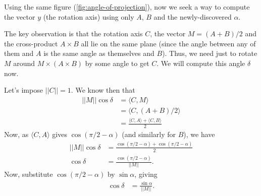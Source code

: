 \documentclass{article}
\begin{document}
Using the same figure (\ref{fig:angle-of-projection}),
now we seek a way to compute the vector $y$
(the rotation axis)
using only $A$, $B$ and the newly-discovered $\alpha$.

The key observation is that the rotation axis $C$,
the vector $M = (A + B)/2$ and the cross-product $A \times B$
all lie on the same plane
(since the angle between any of them and $A$ is the same angle as
themselves and $B$).
Thus, we need just to rotate $M$ around $M \times (A \times B)$
by some angle to get $C$.
We will compute this angle $\delta$ now.

Let's impose $||C|| = 1$.
We know then that
\begin{align*}
    ||M|| \cos \delta &= \langle C, M \rangle \\
                      &= \langle C, (A + B) / 2 \rangle \\
                      &= \frac{ \langle C, A \rangle + \langle C, B \rangle }{2}
\end{align*}
Now, as $\langle C, A \rangle$ gives $\cos( \pi/2 - \alpha )$
(and similarly for $B$),
we have
\begin{align*}
    ||M|| \cos \delta &= \frac{ \cos(\pi/2 - \alpha) + \cos(\pi/2 - \alpha)}{2} \\
    \cos \delta &= \frac{\cos(\pi/2 - \alpha)}{||M||}.
\end{align*}
Now, substitute $\cos(\pi/2 - \alpha)$ by $\sin \alpha$, giving
\begin{align*}
    \cos \delta &= \frac{\sin \alpha}{||M||}.
\end{align*}
\end{document}
